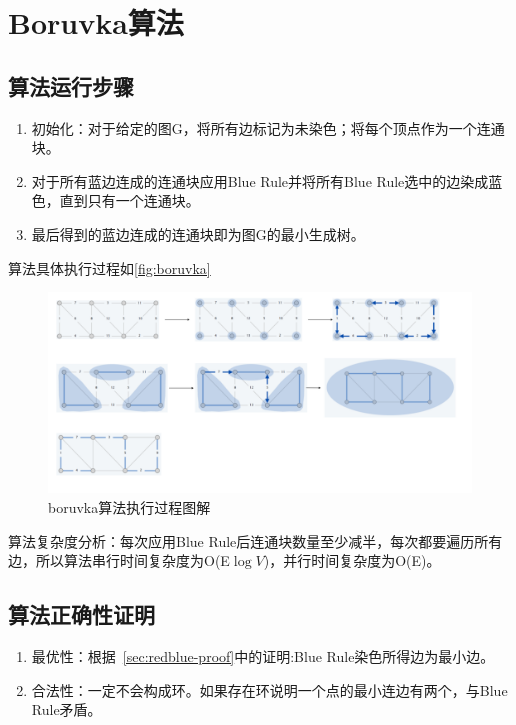 \section{Boruvka算法}
\subsection{算法运行步骤}
\begin{enumerate}
	\item 初始化：对于给定的图G，将所有边标记为未染色；将每个顶点作为一个连通块。
	\item 对于所有蓝边连成的连通块应用Blue Rule并将所有Blue Rule选中的边染成蓝色，直到只有一个连通块。
	\item 最后得到的蓝边连成的连通块即为图G的最小生成树。
\end{enumerate}

算法具体执行过程如\autoref{fig:boruvka}
\begin{figure}[h]
	\centering
	\includegraphics[scale=0.4]{image/boruvka.png}
  \caption{boruvka算法执行过程图解}\label{fig:boruvka}
\end{figure}

算法复杂度分析：每次应用Blue Rule后连通块数量至少减半，每次都要遍历所有边，所以算法串行时间复杂度为O(E$\log V$)，并行时间复杂度为O(E)。

\subsection{算法正确性证明}
\begin{enumerate}
	\item 最优性：根据~\ref{sec:redblue-proof}中的证明:Blue Rule染色所得边为最小边。
	\item 合法性：一定不会构成环。如果存在环说明一个点的最小连边有两个，与Blue Rule矛盾。
\end{enumerate}
